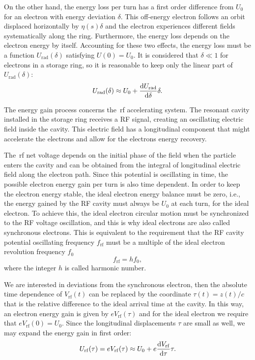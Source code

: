 On the other hand, the energy loss per turn has a first order difference from $U_0$ for an electron with energy deviation $\delta$. This off-energy electron follows an orbit displaced horizontally by $\eta(s)\delta$ and the electron experiences different fields systematically along the ring. Furthermore, the energy loss depends on the electron energy by itself. Accounting for these two effects, the energy loss must be a function $U_{\mathrm{rad}}(\delta)$ satisfying $U(0) = U_0$. It is considered that $\delta \ll 1$ for electrons in a storage ring, so it is reasonable to keep only the linear part of $U_{\mathrm{rad}}(\delta)$:
\begin{equation}
    U_{\mathrm{rad}}(\delta) \approx U_0 + \dfrac{\mathrm{d} U_{\mathrm{rad}}}{\mathrm{d} \delta}\delta.
    \label{approx1}
\end{equation}

The energy gain process concerns the~\gls{rf} accelerating system. The resonant cavity installed in the storage ring receives a RF signal, creating an oscillating electric field inside the cavity. This electric field has a longitudinal component that might accelerate the electrons and allow for the electrons energy recovery.

The~\gls{rf} net voltage depends on the initial phase of the field when the particle enters the cavity and can be obtained from the integral of longitudinal electric field along the electron path. Since this potential is oscillating in time, the possible electron energy gain per turn is also time dependent. In order to keep the electron energy stable, the ideal electron energy balance must be zero, i.e., the energy gained by the RF cavity must always be $U_0$ at each turn, for the ideal electron. To achieve this, the ideal electron circular motion must be synchronized to the RF voltage oscillation, and this is why ideal electrons are also called synchronous electrons. This is equivalent to the requirement that the RF cavity potential oscillating frequency $f_{\mathrm{rf}}$ must be a multiple of the ideal electron revolution frequency $f_0$
\begin{equation}
    f_{\mathrm{rf}} = h f_0,
\end{equation}
where the integer $h$ is called harmonic number.

We are interested in deviations from the synchronous electron, then the absolute time dependence of $V_{\mathrm{rf}}(t)$ can be replaced by the coordinate $\tau(t) = z(t)/c$ that is the relative difference to the ideal arrival time at the cavity. In this way, an electron energy gain is given by $eV_{\mathrm{rf}}(\tau)$ and for the ideal electron we require that $eV_{\mathrm{rf}}(0) = U_0$. Since the longitudinal displacements $\tau$ are small as well, we may expand the energy gain in first order:
\begin{equation}
    U_{\mathrm{rf}}(\tau) = eV_{\mathrm{rf}}(\tau) \approx U_0 + e\dfrac{\mathrm{d} V_{\mathrm{rf}}}{\mathrm{d} \tau}\tau.
    \label{approx2}
\end{equation}

